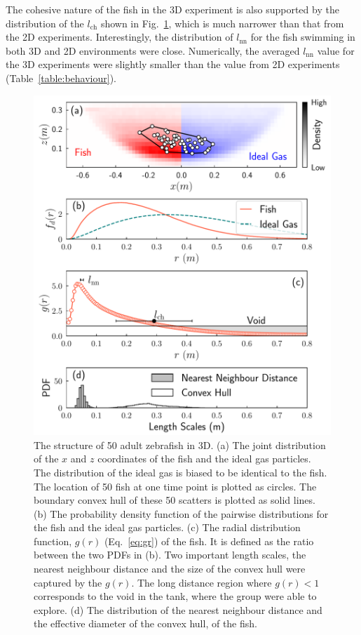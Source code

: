 \documentclass[11pt,twoside]{report}
\begin{document}
The cohesive nature of the fish in the 3D experiment is also supported by the distribution of the $l_\mathrm{ch}$ shown in Fig.~\ref{fig:structure-3d}, which is much narrower than that from the 2D experiments. Interestingly, the distribution of $l_\mathrm{nn}$ for the fish swimming in both 3D and 2D environments were close. Numerically, the averaged $l_\mathrm{nn}$ value for the 3D experiments were slightly smaller than the value from 2D experiments (Table~\ref{table:behaviour}).


\begin{figure}
  \includegraphics[width=\linewidth]{structure-3d-50}
  \caption[The structure of 50 fish in 3D]{
  	The structure of 50 adult zebrafish in 3D.
  	(a) The joint distribution of the $x$ and $z$ coordinates of the fish and the ideal gas particles. The distribution of the ideal gas is biased to be identical to the fish. The location of 50 fish at one time point is plotted as circles. The boundary convex hull of these 50 scatters is plotted as solid lines.
  	(b) The probability density function of the pairwise distributions for the fish and the ideal gas particles.
  	(c) The radial distribution function, $g(r)$ (Eq.~\ref{eq:gr}) of the fish. It is defined as the ratio between the two PDFs in (b). Two important length scales, the nearest neighbour distance and the size of the convex hull were captured by the $g(r)$. The long distance region where $g(r) < 1$ corresponds to the void in the tank, where the group were able to explore.
  	(d) The distribution of the nearest neighbour distance and the effective diameter of the convex hull, of the fish.
  }
  \label{fig:structure-3d}
\end{figure}
\end{document}

